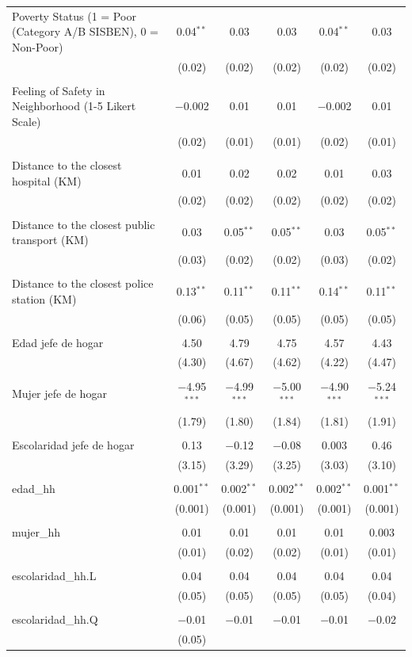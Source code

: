 \begin{table}[H]
\begin{tabularx}{0.9\textwidth}{@{\extracolsep{-7pt}}lccccc}
 Poverty Status (1 = Poor (Category A/B SISBEN), 0 = Non-Poor) & 0.04$^{**}$ & 0.03 & 0.03 & 0.04$^{**}$ & 0.03 \\    & (0.02) & (0.02) & (0.02) & (0.02) & (0.02) \\    & & & & & \\   Feeling of Safety in Neighborhood (1-5 Likert Scale) & $-$0.002 & 0.01 & 0.01 & $-$0.002 & 0.01 \\    & (0.02) & (0.01) & (0.01) & (0.02) & (0.01) \\    & & & & & \\   Distance to the closest hospital (KM) & 0.01 & 0.02 & 0.02 & 0.01 & 0.03 \\    & (0.02) & (0.02) & (0.02) & (0.02) & (0.02) \\    & & & & & \\   Distance to the closest public transport  (KM) & 0.03 & 0.05$^{**}$ & 0.05$^{**}$ & 0.03 & 0.05$^{**}$ \\    & (0.03) & (0.02) & (0.02) & (0.03) & (0.02) \\    & & & & & \\   Distance to the closest police station (KM) & 0.13$^{**}$ & 0.11$^{**}$ & 0.11$^{**}$ & 0.14$^{**}$ & 0.11$^{**}$ \\    & (0.06) & (0.05) & (0.05) & (0.05) & (0.05) \\    & & & & & \\   Edad jefe de hogar & 4.50 & 4.79 & 4.75 & 4.57 & 4.43 \\    & (4.30) & (4.67) & (4.62) & (4.22) & (4.47) \\    & & & & & \\   Mujer jefe de hogar & $-$4.95$^{***}$ & $-$4.99$^{***}$ & $-$5.00$^{***}$ & $-$4.90$^{***}$ & $-$5.24$^{***}$ \\    & (1.79) & (1.80) & (1.84) & (1.81) & (1.91) \\    & & & & & \\   Escolaridad jefe de hogar & 0.13 & $-$0.12 & $-$0.08 & 0.003 & 0.46 \\    & (3.15) & (3.29) & (3.25) & (3.03) & (3.10) \\    & & & & & \\   edad\_hh & 0.001$^{**}$ & 0.002$^{**}$ & 0.002$^{**}$ & 0.002$^{**}$ & 0.001$^{**}$ \\    & (0.001) & (0.001) & (0.001) & (0.001) & (0.001) \\    & & & & & \\   mujer\_hh & 0.01 & 0.01 & 0.01 & 0.01 & 0.003 \\    & (0.01) & (0.02) & (0.02) & (0.01) & (0.01) \\    & & & & & \\   escolaridad\_hh.L & 0.04 & 0.04 & 0.04 & 0.04 & 0.04 \\    & (0.05) & (0.05) & (0.05) & (0.05) & (0.04) \\    & & & & & \\   escolaridad\_hh.Q & $-$0.01 & $-$0.01 & $-$0.01 & $-$0.01 & $-$0.02 \\    & (0.05) & 
\end{tabularx}
\end{table}
